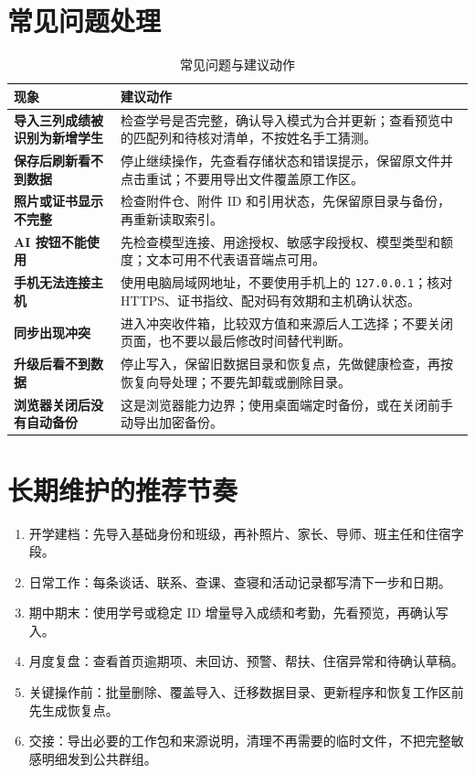 \documentclass[UTF8,zihao=-4,oneside]{ctexrep}
\newcommand{\code}[1]{\texttt{\small #1}}
\begin{document}
\section{常见问题处理}

\small
\begin{longtable}{>{\bfseries}p{45mm} p{94mm}}
\caption{常见问题与建议动作}\\
\toprule
现象 & 建议动作 \\
\midrule
导入三列成绩被识别为新增学生 & 检查学号是否完整，确认导入模式为合并更新；查看预览中的匹配列和待核对清单，不按姓名手工猜测。 \\
保存后刷新看不到数据 & 停止继续操作，先查看存储状态和错误提示，保留原文件并点击重试；不要用导出文件覆盖原工作区。 \\
照片或证书显示不完整 & 检查附件仓、附件 ID 和引用状态，先保留原目录与备份，再重新读取索引。 \\
AI 按钮不能使用 & 先检查模型连接、用途授权、敏感字段授权、模型类型和额度；文本可用不代表语音端点可用。 \\
手机无法连接主机 & 使用电脑局域网地址，不要使用手机上的 \code{127.0.0.1}；核对 HTTPS、证书指纹、配对码有效期和主机确认状态。 \\
同步出现冲突 & 进入冲突收件箱，比较双方值和来源后人工选择；不要关闭页面，也不要以最后修改时间替代判断。 \\
升级后看不到数据 & 停止写入，保留旧数据目录和恢复点，先做健康检查，再按恢复向导处理；不要先卸载或删除目录。 \\
浏览器关闭后没有自动备份 & 这是浏览器能力边界；使用桌面端定时备份，或在关闭前手动导出加密备份。 \\
\bottomrule
\end{longtable}
\normalsize

\section{长期维护的推荐节奏}

\begin{enumerate}
  \item 开学建档：先导入基础身份和班级，再补照片、家长、导师、班主任和住宿字段。
  \item 日常工作：每条谈话、联系、查课、查寝和活动记录都写清下一步和日期。
  \item 期中期末：使用学号或稳定 ID 增量导入成绩和考勤，先看预览，再确认写入。
  \item 月度复盘：查看首页逾期项、未回访、预警、帮扶、住宿异常和待确认草稿。
  \item 关键操作前：批量删除、覆盖导入、迁移数据目录、更新程序和恢复工作区前先生成恢复点。
  \item 交接：导出必要的工作包和来源说明，清理不再需要的临时文件，不把完整敏感明细发到公共群组。
\end{enumerate}
\end{document}
